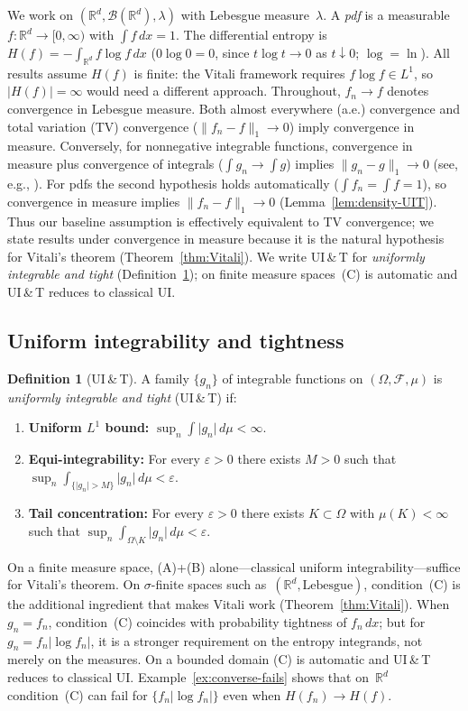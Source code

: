 \documentclass[journal]{IEEEtran}
\theoremstyle{definition}
\newtheorem{definition}[theorem]{Definition}
\theoremstyle{remark}
\newcommand{\Rd}{\mathbb{R}^d}
\newcommand{\1}{\mathbf{1}}
\newcommand{\Hent}{H}
\newcommand{\abs}[1]{\lvert #1 \rvert}
\newcommand{\norm}[1]{\lVert #1 \rVert}
\newcommand{\dx}{\,dx}
\begin{document}
We work on $(\Rd, \mathcal{B}(\Rd), \lambda)$ with Lebesgue
measure~$\lambda$.  A \emph{pdf} is a measurable
$f : \Rd \to [0,\infty)$ with $\int f\dx = 1$.  The differential
entropy is $\Hent(f) = -\int_{\Rd} f \log f \dx$ ($0\log 0 = 0$,
since $t\log t \to 0$ as $t \downarrow 0$; $\log = \ln$).
All results assume $\Hent(f)$ is finite: the Vitali
framework requires $f\log f \in L^1$, so
$\abs{\Hent(f)} = \infty$ would need a different approach.
Throughout, $f_n \to f$ denotes convergence in
Lebesgue measure.  Both almost everywhere (a.e.) convergence and total
variation (TV) convergence ($\norm{f_n - f}_1 \to 0$) imply
convergence in measure.  Conversely, for nonneg\-ative
integrable functions, convergence in measure plus convergence
of integrals ($\int g_n \to \int g$) implies
$\norm{g_n - g}_1 \to 0$
(see, e.g., {\cite[p.~97]{Folland1999}}).  For pdfs the
second hypothesis holds automatically ($\int f_n = \int f = 1$),
so convergence in measure implies $\norm{f_n - f}_1 \to 0$
(Lemma~\ref{lem:density-UIT}).
Thus our baseline assumption is
effectively equivalent to TV convergence; we state results
under convergence in measure because it is the natural
hypothesis for Vitali's theorem (Theorem~\ref{thm:Vitali}).
We write UI\,\&\,T for
\emph{uniformly integrable and tight}
(Definition~\ref{def:UI}); on finite measure spaces~(C) is
automatic and UI\,\&\,T reduces to classical UI.

\subsection{Uniform integrability and tightness}

\begin{definition}[UI\,\&\,T]\label{def:UI}
A family $\{g_n\}$ of integrable functions on
$(\Omega, \mathcal{F}, \mu)$ is \emph{uniformly integrable
and tight} (UI\,\&\,T) if:
\begin{enumerate}
\item[(A)] \textbf{Uniform $L^1$ bound:}
  $\sup_{n} \int \abs{g_n} \, d\mu < \infty$.
\item[(B)] \textbf{Equi-integrability:}
  For every $\varepsilon > 0$ there exists $M > 0$ such that
  $\sup_n \int_{\{\abs{g_n} > M\}} \abs{g_n} \, d\mu < \varepsilon$.
\item[(C)] \textbf{Tail concentration:}
  For every $\varepsilon > 0$ there exists $K \subset \Omega$
  with $\mu(K) < \infty$ such that
  $\sup_n \int_{\Omega \setminus K} \abs{g_n} \, d\mu < \varepsilon$.
\end{enumerate}
On a finite measure space, (A)+(B) alone---classical uniform
integrability---suffice for Vitali's theorem.
On $\sigma$-finite spaces such as~$(\Rd,\text{Lebesgue})$,
condition~(C) is the additional ingredient that makes Vitali work
(Theorem~\ref{thm:Vitali}).
When $g_n = f_n$, condition~(C) coincides with probability tightness
of $f_n\dx$; but for $g_n = f_n\abs{\log f_n}$, it is a stronger
requirement on the entropy integrands, not merely on the measures.
On a bounded domain (C) is automatic and
UI\,\&\,T reduces to classical UI.
Example~\ref{ex:converse-fails} shows that on~$\Rd$ condition~(C)
can fail for $\{f_n\abs{\log f_n}\}$ even when
$\Hent(f_n) \to \Hent(f)$.
\end{definition}
\end{document}
